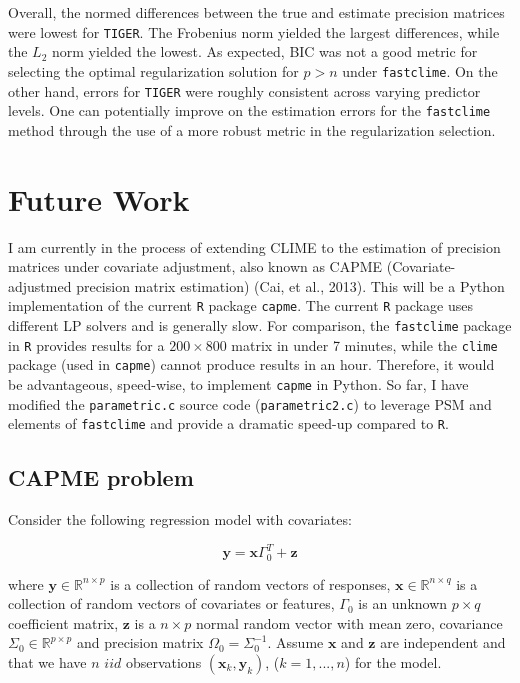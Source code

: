 \documentclass{article}
\begin{document}
    Overall, the normed differences between the true and estimate precision
matrices were lowest for \texttt{TIGER}. The Frobenius norm yielded the
largest differences, while the $L_2$ norm yielded the lowest. As
expected, BIC was not a good metric for selecting the optimal
regularization solution for $p > n$ under \texttt{fastclime}. On the
other hand, errors for \texttt{TIGER} were roughly consistent across
varying predictor levels. One can potentially improve on the estimation
errors for the \texttt{fastclime} method through the use of a more
robust metric in the regularization selection.

    \section{Future Work}\label{future-work}

    I am currently in the process of extending CLIME to the estimation of
precision matrices under covariate adjustment, also known as CAPME
(Covariate-adjustmed precision matrix estimation) (Cai, et al., 2013).
This will be a Python implementation of the current \texttt{R} package
\texttt{capme}. The current \texttt{R} package uses different LP solvers
and is generally slow. For comparison, the \texttt{fastclime} package in
\texttt{R} provides results for a $200\times 800$ matrix in under 7
minutes, while the \texttt{clime} package (used in \texttt{capme})
cannot produce results in an hour. Therefore, it would be advantageous,
speed-wise, to implement \texttt{capme} in Python. So far, I have
modified the \texttt{parametric.c} source code (\texttt{parametric2.c})
to leverage PSM and elements of \texttt{fastclime} and provide a
dramatic speed-up compared to \texttt{R}.

    \subsection{CAPME problem}\label{capme-problem}

    Consider the following regression model with covariates:

\[
\textbf{y}=\textbf{x}\Gamma_0^T+\textbf{z}
\]

where $\textbf{y}\in\mathbb{R}^{n\times p}$ is a collection of random
vectors of responses, $\textbf{x}\in\mathbb{R}^{n\times q}$ is a
collection of random vectors of covariates or features, $\Gamma_0$ is an
unknown $p\times q$ coefficient matrix, $\textbf{z}$ is a $n\times p$
normal random vector with mean zero, covariance
$\Sigma_0\in\mathbb{R}^{p\times p}$ and precision matrix
$\Omega_0=\Sigma_0^{-1}$. Assume $\textbf{x}$ and $\textbf{z}$ are
independent and that we have $n$ $iid$ observations
$(\textbf{x}_k,\textbf{y}_k)$, ($k=1,...,n$) for the model.
\end{document}
